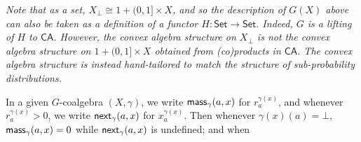 \hypertarget{html:S5.Thmtheorem6.p1}{} \emph{Note that as a set, %
\hypertarget{html:S5.Thmtheorem6.p1.m1}{}\({X_{\bot}\cong 1+(0,1]\times X}\), and so the description of %
\hypertarget{html:S5.Thmtheorem6.p1.m2}{}\({G(X)}\) above can also be taken as a definition of a functor %
\hypertarget{html:S5.Thmtheorem6.p1.m3}{}\({H\colon\mathsf{Set}\to\mathsf{Set}}\). Indeed, %
\hypertarget{html:S5.Thmtheorem6.p1.m4}{}\({G}\) is a lifting of %
\hypertarget{html:S5.Thmtheorem6.p1.m5}{}\({H}\) to %
\hypertarget{html:S5.Thmtheorem6.p1.m6}{}\({\mathsf{CA}}\). However, the convex algebra structure on %
\hypertarget{html:S5.Thmtheorem6.p1.m7}{}\({X_{\bot}}\) is not the convex algebra structure on %
\hypertarget{html:S5.Thmtheorem6.p1.m8}{}\({1+(0,1]\times X}\) obtained from (co)products in %
\hypertarget{html:S5.Thmtheorem6.p1.m9}{}\({\mathsf{CA}}\). The convex algebra structure is instead hand-tailored to match the structure of sub-probability distributions.}
\par\medskip
\hypertarget{html:S5.SS0.SSS0.Px1.p5}{} In a given %
\hypertarget{html:S5.SS0.SSS0.Px1.p5.m1}{}\({G}\)-coalgebra %
\hypertarget{html:S5.SS0.SSS0.Px1.p5.m2}{}\({(X,\gamma)}\), we write %
\hypertarget{html:S5.SS0.SSS0.Px1.p5.m3}{}\({\mbox{\sf mass}_{\gamma}(a,x)}\) for %
\hypertarget{html:S5.SS0.SSS0.Px1.p5.m4}{}\({r_{a}^{\gamma(x)}}\), and whenever %
\hypertarget{html:S5.SS0.SSS0.Px1.p5.m5}{}\({r_{a}^{\gamma(x)}>0}\), we write %
\hypertarget{html:S5.SS0.SSS0.Px1.p5.m6}{}\({\mbox{\sf next}_{\gamma}(a,x)}\) for %
\hypertarget{html:S5.SS0.SSS0.Px1.p5.m7}{}\({x_{a}^{\gamma(x)}}\). Then whenever %
\hypertarget{html:S5.SS0.SSS0.Px1.p5.m8}{}\({\gamma(x)(a)=\bot}\), %
\hypertarget{html:S5.SS0.SSS0.Px1.p5.m9}{}\({\mbox{\sf mass}_{\gamma}(a,x)=0}\) while %
\hypertarget{html:S5.SS0.SSS0.Px1.p5.m10}{}\({\mbox{\sf next}_{\gamma}(a,x)}\) is undefined; and when %
